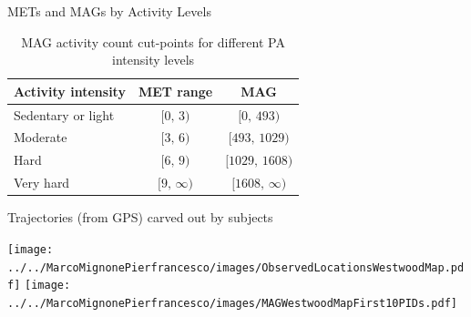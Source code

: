 \documentclass[
10pt]{beamer}
\begin{document}
\begin{frame}{METs and MAGs by Activity Levels}
 
 \begin{table}[]
    \centering
    \begin{tabular}{l|cc}\hline
    \textbf{Activity intensity} & MET range       &  MAG \\\hline
    Sedentary or light     & $[0,\, 3)$     &   $[0,\,493)$   \\
    Moderate               & $[3,\, 6)$     &   $[493,\,1029)$     \\
    Hard                   & $[6,\, 9)$     &   $[1029,\,1608)$    \\
    Very hard              & $[9,\,\infty)$ &   $[1608,\,\infty)$     \\ \hline
    \end{tabular}
    \caption{MAG activity count cut-points for different PA intensity levels}
    \label{tab:METCutPoins}
\end{table}
 
\end{frame}


\begin{frame}{Trajectories (from GPS) carved out by subjects}
 
 \begin{center}
  \texttt{[image: ../../MarcoMignonePierfrancesco/images/ObservedLocationsWestwoodMap.pdf]}
  \texttt{[image: ../../MarcoMignonePierfrancesco/images/MAGWestwoodMapFirst10PIDs.pdf]}
 \end{center}
 
\end{frame}
\end{document}
